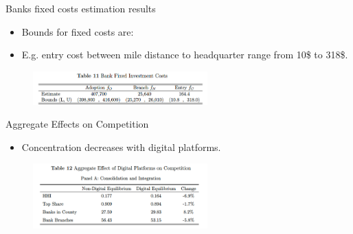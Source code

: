 \documentclass[notes,10pt, aspectratio=169]{beamer}
\begin{document}
            \begin{frame}{Banks fixed costs estimation results}\label{fixed_costs}

                \begin{itemize}
                    \item Bounds for fixed costs are:
                    \item E.g. entry cost between mile distance to headquarter range from 10\$ to 318\$.
                \end{itemize}

                \begin{figure}
                    \centering
                    \includegraphics[width=0.6\textwidth]{imgs/tab11.png}
                \end{figure}
                
            \end{frame}

            \begin{frame}{Aggregate Effects on Competition}\label{agg_effects}
                \begin{itemize}
                    \item Concentration decreases with digital platforms.
                \end{itemize}



                \begin{figure}
                    \centering
                    \includegraphics[width=0.6\textwidth]{imgs/tab12.png}
                \end{figure}
                
            \end{frame}
\end{document}

